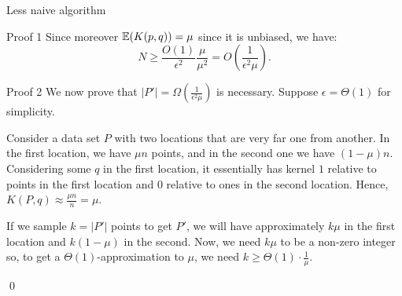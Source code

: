 \documentclass[a4paper]{article}
\begin{document}
\begin{parag}{Less naive algorithm}
\begin{subparag}{Proof 1}
        Since moreover $\exval\left(K\left(p, q\right)\right) = \mu$ since it is unbiased, we have: 
        \[N \geq \frac{O\left(1\right)}{\epsilon^2} \frac{\mu}{\mu^2} = O\left(\frac{1}{\epsilon^2 \mu}\right).\]
        
    \end{subparag}
    
    \begin{subparag}{Proof 2}
        We now prove that $\left|P'\right| = \Omega\left(\frac{1}{\epsilon^2 \mu}\right)$ is necessary. Suppose $\epsilon = \Theta\left(1\right)$ for simplicity.

        Consider a data set $P$ with two locations that are very far one from another. In the first location, we have $\mu n$ points, and in the second one we have $\left(1 - \mu\right) n$. Considering some $q$ in the first location, it essentially has kernel $1$ relative to points in the first location and $0$ relative to ones in the second location. Hence, $K\left(P, q\right) \approx \frac{\mu n}{n} = \mu$.

        If we sample $k = \left|P'\right|$ points to get $P'$, we will have approximately $k \mu$ in the first location and $k \left(1 - \mu\right)$ in the second. Now, we need $k \mu$ to be a non-zero integer so, to get a $\Theta\left(1\right)$-approximation to $\mu$,  we need $k \geq \Theta\left(1\right)\cdot \frac{1}{\mu}$.

        \qed
    \end{subparag}
\end{parag}
\end{document}
